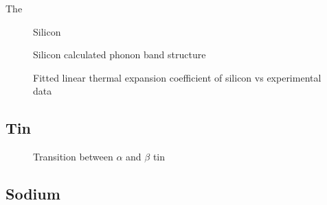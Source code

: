 \documentclass[12pt]{article}
\begin{document}
The 
\begin{figure}
	\centering
	
	\label{fig:si_two_temps}
	\caption{Silicon}
\end{figure}

\begin{figure}
	\centering
	\qquad
{}\qquad
\end{figure}

\begin{figure}
	\centering
	
	\label{fig:si_band_structure}
	\caption{Silicon calculated phonon band structure}
\end{figure}

\begin{figure}
	\centering
	
	\label{fig:si_thermal_expansion}
	\caption{Fitted linear thermal expansion coefficient of silicon vs experimental data \cite{middelmann2015thermal}}
\end{figure}
\subsection{Tin}
\begin{figure}
	\centering
	\subfloat{
		
}\qquad
\subfloat{
		
}\qquad
\end{figure}
\begin{figure}
	\centering
	
	\label{fig:sn_transition}
	\caption{Transition between $\alpha$ and $\beta$ tin}
\end{figure}
\subsection{Sodium}
\begin{figure}
	\centering
	\subfloat{
		
}\qquad
\subfloat{
		
}\qquad
\end{figure}
\begin{figure}
	\centering
	
\end{figure}
\end{document}
